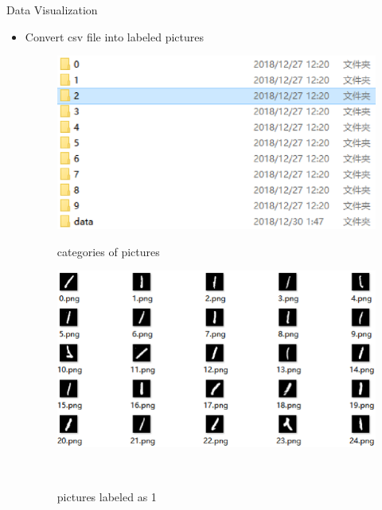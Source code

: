 \documentclass[
 size=12pt,
 paper=smartboard, %
 mode=present, %
 display=slides, %
style=tuliplab,
pauseslide,
fleqn,leqno]{powerdot}
\begin{document}
\begin{slide}{Data Visualization}
  \begin{itemize}
    \item Convert csv file into labeled pictures \pause
    \begin{figure}[h]
      \begin{minipage}[t]{0.4\linewidth}
        \centering
        \includegraphics[width=1.2\textwidth]{figures/pic-categories.eps}
        \caption{categories of pictures}
        \label{fig:categories-picture}
      \end{minipage}
      \hfill
      \begin{minipage}[t]{0.4\linewidth}
        \centering
        \includegraphics[width=1.2\textwidth]{figures/pic-label1.eps}
        \caption{pictures labeled as 1}
        \label{fig:pic-label1}
      \end{minipage} 
    \end{figure}
  \end{itemize}
\end{slide}
\end{document}
